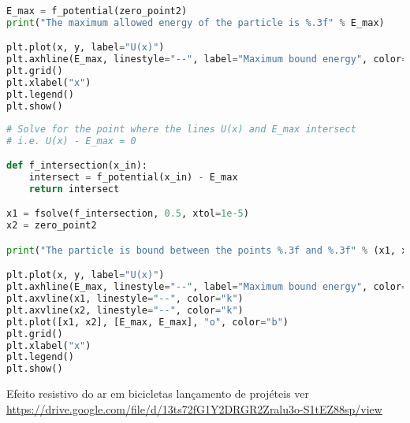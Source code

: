 \begin{lstlisting}[language=Python, frame=lines,basicstyle=\footnotesize, caption={Energia Máxima de uma partícula presa pelo potencial. Dados disponíveis no arquivo Potential.txt},label={lst:Potential3}]
E_max = f_potential(zero_point2)
print("The maximum allowed energy of the particle is %.3f" % E_max)

plt.plot(x, y, label="U(x)")
plt.axhline(E_max, linestyle="--", label="Maximum bound energy", color="k")
plt.grid()
plt.xlabel("x")
plt.legend()
plt.show()
\end{lstlisting}

\begin{lstlisting}[language=Python, frame=lines,basicstyle=\footnotesize, caption={Região permitida para a partícula presa pelo potencial. Dados disponíveis no arquivo Potential.txt},label={lst:Potential4}]
# Solve for the point where the lines U(x) and E_max intersect
# i.e. U(x) - E_max = 0

def f_intersection(x_in):
    intersect = f_potential(x_in) - E_max
    return intersect

x1 = fsolve(f_intersection, 0.5, xtol=1e-5)
x2 = zero_point2

print("The particle is bound between the points %.3f and %.3f" % (x1, x2))

plt.plot(x, y, label="U(x)")
plt.axhline(E_max, linestyle="--", label="Maximum bound energy", color="k")
plt.axvline(x1, linestyle="--", color="k")
plt.axvline(x2, linestyle="--", color="k")
plt.plot([x1, x2], [E_max, E_max], "o", color="b")
plt.grid()
plt.xlabel("x")
plt.legend()
plt.show()
\end{lstlisting}

Efeito resistivo do ar em bicicletas
lançamento de projéteis
ver \\  \href{URL}{https://drive.google.com/file/d/13ts72fG1Y2DRGR2Zralu3o-S1tEZ88sp/view}

